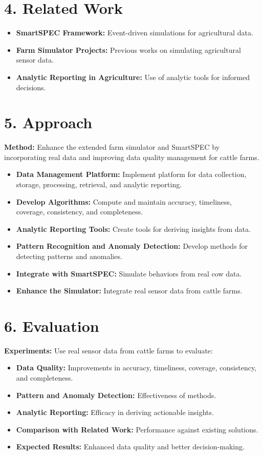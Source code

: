\documentclass[12pt]{article}
\begin{document}
\section*{4. Related Work}
\begin{itemize}
    \item \textbf{SmartSPEC Framework:} Event-driven simulations for agricultural data.
    \item \textbf{Farm Simulator Projects:} Previous works on simulating agricultural sensor data.
    \item \textbf{Analytic Reporting in Agriculture:} Use of analytic tools for informed decisions.
\end{itemize}

\section*{5. Approach}
\textbf{Method:} Enhance the extended farm simulator and SmartSPEC by incorporating real data and improving data quality management for cattle farms.
\begin{itemize}
    \item \textbf{Data Management Platform:} Implement platform for data collection, storage, processing, retrieval, and analytic reporting.
    \item \textbf{Develop Algorithms:} Compute and maintain accuracy, timeliness, coverage, consistency, and completeness.
    \item \textbf{Analytic Reporting Tools:} Create tools for deriving insights from data.
    \item \textbf{Pattern Recognition and Anomaly Detection:} Develop methods for detecting patterns and anomalies.
    \item \textbf{Integrate with SmartSPEC:} Simulate behaviors from real cow data.
    \item \textbf{Enhance the Simulator:} Integrate real sensor data from cattle farms.
\end{itemize}

\section*{6. Evaluation}
\textbf{Experiments:} Use real sensor data from cattle farms to evaluate:
\begin{itemize}
    \item \textbf{Data Quality:} Improvements in accuracy, timeliness, coverage, consistency, and completeness.
    \item \textbf{Pattern and Anomaly Detection:} Effectiveness of methods.
    \item \textbf{Analytic Reporting:} Efficacy in deriving actionable insights.
    \item \textbf{Comparison with Related Work:} Performance against existing solutions.
    \item \textbf{Expected Results:} Enhanced data quality and better decision-making.
\end{itemize}
\end{document}
